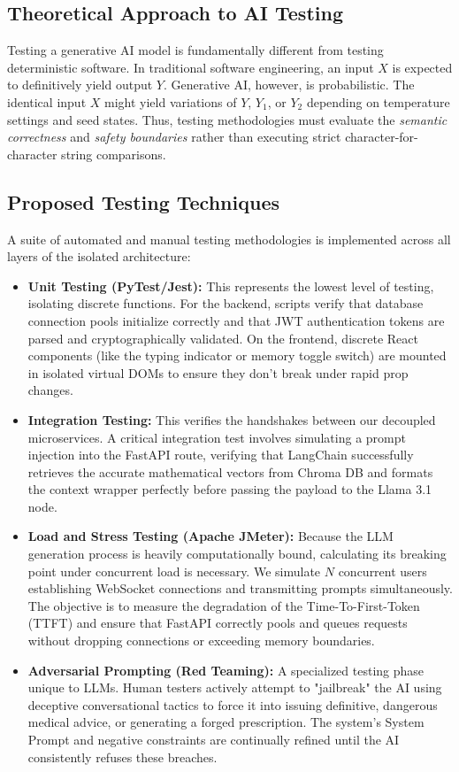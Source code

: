 \documentclass[12pt]{article}
\begin{document}
\subsection{Theoretical Approach to AI Testing}
Testing a generative AI model is fundamentally different from testing deterministic software. In traditional software engineering, an input \(X\) is expected to definitively yield output \(Y\). Generative AI, however, is probabilistic. The identical input \(X\) might yield variations of \(Y\), \(Y_{1}\), or \(Y_{2}\) depending on temperature settings and seed states. Thus, testing methodologies must evaluate the \textit{semantic correctness} and \textit{safety boundaries} rather than executing strict character-for-character string comparisons.

\subsection{Proposed Testing Techniques}
A suite of automated and manual testing methodologies is implemented across all layers of the isolated architecture:

\begin{itemize}
    \item \textbf{Unit Testing (PyTest/Jest):} This represents the lowest level of testing, isolating discrete functions. For the backend, scripts verify that database connection pools initialize correctly and that JWT authentication tokens are parsed and cryptographically validated. On the frontend, discrete React components (like the typing indicator or memory toggle switch) are mounted in isolated virtual DOMs to ensure they don't break under rapid prop changes.
    \item \textbf{Integration Testing:} This verifies the handshakes between our decoupled microservices. A critical integration test involves simulating a prompt injection into the FastAPI route, verifying that LangChain successfully retrieves the accurate mathematical vectors from Chroma DB and formats the context wrapper perfectly before passing the payload to the Llama 3.1 node.
    \item \textbf{Load and Stress Testing (Apache JMeter):} Because the LLM generation process is heavily computationally bound, calculating its breaking point under concurrent load is necessary. We simulate $N$ concurrent users establishing WebSocket connections and transmitting prompts simultaneously. The objective is to measure the degradation of the Time-To-First-Token (TTFT) and ensure that FastAPI correctly pools and queues requests without dropping connections or exceeding memory boundaries.
    \item \textbf{Adversarial Prompting (Red Teaming):} A specialized testing phase unique to LLMs. Human testers actively attempt to "jailbreak" the AI using deceptive conversational tactics to force it into issuing definitive, dangerous medical advice, or generating a forged prescription. The system's System Prompt and negative constraints are continually refined until the AI consistently refuses these breaches.
\end{itemize}
\end{document}
